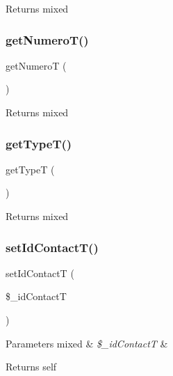 \begin{DoxyReturn}{Returns}
mixed 
\end{DoxyReturn}
\mbox{\label{class_telephone_af821c49d9b6fa23e50cfdf5a8c663386}} 
\subsubsection{\texorpdfstring{get\+Numero\+T()}{getNumeroT()}}
{\footnotesize\ttfamily get\+NumeroT (\begin{DoxyParamCaption}{ }\end{DoxyParamCaption})}

\begin{DoxyReturn}{Returns}
mixed 
\end{DoxyReturn}
\mbox{\label{class_telephone_aab4f775b08fc3c7e3dea604b761badb3}} 
\subsubsection{\texorpdfstring{get\+Type\+T()}{getTypeT()}}
{\footnotesize\ttfamily get\+TypeT (\begin{DoxyParamCaption}{ }\end{DoxyParamCaption})}

\begin{DoxyReturn}{Returns}
mixed 
\end{DoxyReturn}
\mbox{\label{class_telephone_a1a07b52642ad0c3920743d2cbc936358}} 
\subsubsection{\texorpdfstring{set\+Id\+Contact\+T()}{setIdContactT()}}
{\footnotesize\ttfamily set\+Id\+ContactT (\begin{DoxyParamCaption}\item[{}]{\$\+\_\+id\+ContactT }\end{DoxyParamCaption})}


\begin{DoxyParams}[1]{Parameters}
mixed & {\em \$\+\_\+id\+ContactT} & \\
\hline
\end{DoxyParams}
\begin{DoxyReturn}{Returns}
self 
\end{DoxyReturn}
\mbox{\label{class_telephone_ab9ef23d090b57d8c859c184c0a6eedcc}} 
